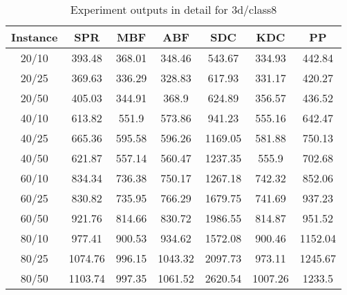 \begin{table}[ht!]
    \caption{Experiment outputs in detail for 3d/class8}
    \centering
    \begin{tabular}{@{}ccccccc@{}}
        \toprule
        {\bfseries Instance} & {\bfseries SPR} & {\bfseries MBF}
        & {\bfseries ABF} & {\bfseries SDC} & {\bfseries KDC} & {\bfseries PP}\\
        \midrule
        20/10 & 393.48 & 368.01 & 348.46 & 543.67 & 334.93 & 442.84\\
        20/25 & 369.63 & 336.29 & 328.83 & 617.93 & 331.17 & 420.27\\
        20/50 & 405.03 & 344.91 & 368.9 & 624.89 & 356.57 & 436.52\\
        40/10 & 613.82 & 551.9 & 573.86 & 941.23 & 555.16 & 642.47\\
        40/25 & 665.36 & 595.58 & 596.26 & 1169.05 & 581.88 & 750.13\\
        40/50 & 621.87 & 557.14 & 560.47 & 1237.35 & 555.9 & 702.68\\
        60/10 & 834.34 & 736.38 & 750.17 & 1267.18 & 742.32 & 852.06\\
        60/25 & 830.82 & 735.95 & 766.29 & 1679.75 & 741.69 & 937.23\\
        60/50 & 921.76 & 814.66 & 830.72 & 1986.55 & 814.87 & 951.52\\
        80/10 & 977.41 & 900.53 & 934.62 & 1572.08 & 900.46 & 1152.04\\
        80/25 & 1074.76 & 996.15 & 1043.32 & 2097.73 & 973.11 & 1245.67\\
        80/50 & 1103.74 & 997.35 & 1061.52 & 2620.54 & 1007.26 & 1233.5\\
        \bottomrule
    \end{tabular}
\end{table}